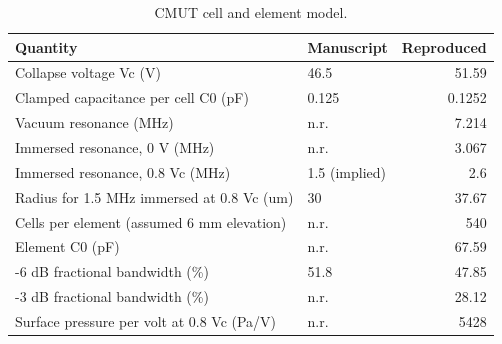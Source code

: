 \begin{table}
\caption{CMUT cell and element model.}
\label{tab:T_S1_cmut_cell}
\begin{tabular}{llr}
\toprule
Quantity & Manuscript & Reproduced \\
\midrule
Collapse voltage Vc (V) & 46.5 & 51.59 \\
Clamped capacitance per cell C0 (pF) & 0.125 & 0.1252 \\
Vacuum resonance (MHz) & n.r. & 7.214 \\
Immersed resonance, 0 V (MHz) & n.r. & 3.067 \\
Immersed resonance, 0.8 Vc (MHz) & 1.5 (implied) & 2.6 \\
Radius for 1.5 MHz immersed at 0.8 Vc (um) & 30 & 37.67 \\
Cells per element (assumed 6 mm elevation) & n.r. & 540 \\
Element C0 (pF) & n.r. & 67.59 \\
-6 dB fractional bandwidth (\%) & 51.8 & 47.85 \\
-3 dB fractional bandwidth (\%) & n.r. & 28.12 \\
Surface pressure per volt at 0.8 Vc (Pa/V) & n.r. & 5428 \\
\bottomrule
\end{tabular}
\end{table}
